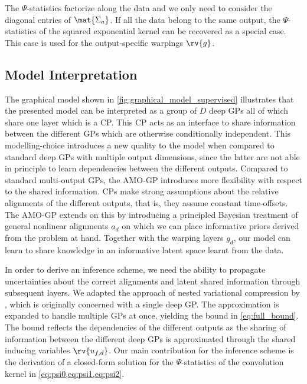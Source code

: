 \documentclass{article}
\begin{document}
The $\Psi$-statistics factorize along the data and we only need to consider the diagonal entries of $\mat{\Sigma_a}$.
If all the data belong to the same output, the $\Psi$-statistics of the squared exponential kernel can be recovered as a special case.
This case is used for the output-specific warpings $\rv{g}$.


\subsection{Model Interpretation}
\label{subsec:interpretation}
The graphical model shown in \cref{fig:graphical_model_supervised} illustrates that the presented model can be interpreted as a group of $D$ deep GPs all of which share one layer which is a CP.
This CP acts as an interface to share information between the different GPs which are otherwise conditionally independent.
This modelling-choice introduces a new quality to the model when compared to standard deep GPs with multiple output dimensions, since the latter are not able in principle to learn dependencies between the different outputs.
Compared to standard multi-output GPs, the AMO-GP introduces more flexibility with respect to the shared information.
CPs make strong assumptions about the relative alignments of the different outputs, that is, they assume constant time-offsets.
The AMO-GP extends on this by introducing a principled Bayesian treatment of general nonlinear alignments $a_d$ on which we can place informative priors derived from the problem at hand.
Together with the warping layers $g_d$, our model can learn to share knowledge in an informative latent space learnt from the data.

In order to derive an inference scheme, we need the ability to propagate uncertainties about the correct alignments and latent shared information through subsequent layers.
We adapted the approach of nested variational compression by \textcite{hensman_nested_2014}, which is originally concerned with a single deep GP.
The approximation is expanded to handle multiple GPs at once, yielding the bound in \cref{eq:full_bound}.
The bound reflects the dependencies of the different outputs as the sharing of information between the different deep GPs is approximated through the shared inducing variables $\rv{u_{f,d}}$.
Our main contribution for the inference scheme is the derivation of a closed-form solution for the $\Psi$-statistics of the convolution kernel in \cref{eq:psi0,eq:psi1,eq:psi2}.
\end{document}
